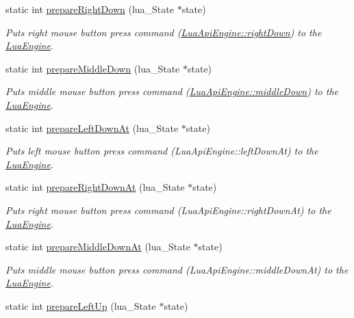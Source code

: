 \begin{DoxyCompactItemize}
static int \hyperlink{class_lua_api_engine_a9975cd495e847300968ce6149846c2f9}{prepare\-Right\-Down} (lua\-\_\-\-State $\ast$state)
\begin{DoxyCompactList}\small\item\em Puts right mouse button press command (\hyperlink{class_lua_api_engine_a14df77fdabe3ddf5dd19c35e70acb2d8}{Lua\-Api\-Engine\-::right\-Down}) to the \hyperlink{class_lua_engine}{Lua\-Engine}. \end{DoxyCompactList}\item 
static int \hyperlink{class_lua_api_engine_a5cd6791cd7b80bb58c0e917f1c35369c}{prepare\-Middle\-Down} (lua\-\_\-\-State $\ast$state)
\begin{DoxyCompactList}\small\item\em Puts middle mouse button press command (\hyperlink{class_lua_api_engine_abea870a5edb171b0bc2345dd1e1e7b95}{Lua\-Api\-Engine\-::middle\-Down}) to the \hyperlink{class_lua_engine}{Lua\-Engine}. \end{DoxyCompactList}\item 
static int \hyperlink{class_lua_api_engine_a15078a5e7a8cedb80f088703b587ec81}{prepare\-Left\-Down\-At} (lua\-\_\-\-State $\ast$state)
\begin{DoxyCompactList}\small\item\em Puts left mouse button press command (Lua\-Api\-Engine\-::left\-Down\-At) to the \hyperlink{class_lua_engine}{Lua\-Engine}. \end{DoxyCompactList}\item 
static int \hyperlink{class_lua_api_engine_a1798695ce32c9d6526a8818535dbc7cf}{prepare\-Right\-Down\-At} (lua\-\_\-\-State $\ast$state)
\begin{DoxyCompactList}\small\item\em Puts right mouse button press command (Lua\-Api\-Engine\-::right\-Down\-At) to the \hyperlink{class_lua_engine}{Lua\-Engine}. \end{DoxyCompactList}\item 
static int \hyperlink{class_lua_api_engine_a6862d91bd6f2a46f7a86f0a5d19c7545}{prepare\-Middle\-Down\-At} (lua\-\_\-\-State $\ast$state)
\begin{DoxyCompactList}\small\item\em Puts middle mouse button press command (Lua\-Api\-Engine\-::middle\-Down\-At) to the \hyperlink{class_lua_engine}{Lua\-Engine}. \end{DoxyCompactList}\item 
static int \hyperlink{class_lua_api_engine_ad60b37dcca8dc42b6a70219b5b9fce95}{prepare\-Left\-Up} (lua\-\_\-\-State $\ast$state)

\end{DoxyCompactItemize}
